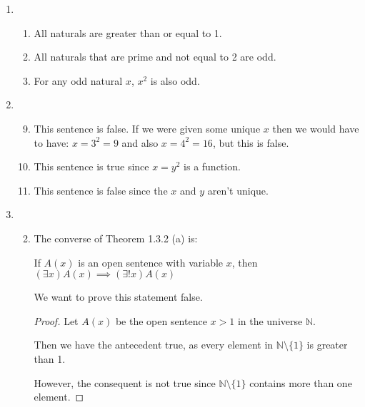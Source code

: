 \documentclass[12pt,letterpaper]{article}
\begin{document}
\begin{enumerate}
\begin{enumerate}
        \item
          \begin{enumerate}
            \item All naturals are greater than or equal to 1.
            \setcounter{enumiii}{2}
            \item All naturals that are prime and not equal to 2 are odd.
            \setcounter{enumiii}{6}
            \item For any odd natural $x$, $x^2$ is also odd.
          \end{enumerate}
        \item
          \begin{enumerate}
            \setcounter{enumiii}{8}
            \item
              This sentence is false.
              If we were given some unique $x$ then we would have to have:
              $x = 3^2 = 9$ and also $x = 4^2 = 16$, but this is false.
            \item
              This sentence is true since $x = y^2$ is a function.
            \item
              This sentence is false since the $x$ and $y$ aren't unique.
          \end{enumerate}
        \item
          \begin{enumerate}
            \setcounter{enumiii}{1}
            \item

              The converse of Theorem 1.3.2 (a) is:

              If $A(x)$ is an open sentence with variable $x$, then
              $(\exists x)A(x) \implies (\exists ! x)A(x)$

              We want to prove this statement false.

              \begin{proof}
                Let $A(x)$ be the open sentence $x > 1$ in the universe $\mathbb{N}$.

                Then we have the antecedent true,
                as every element in $\mathbb{N} \setminus \{1\}$ is greater than 1.

                However, the consequent is not true
                since $\mathbb{N} \setminus \{1\}$ contains more than one element.


\end{proof}
\end{enumerate}
\end{enumerate}
\end{enumerate}
\end{document}
